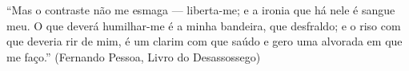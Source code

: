 

\begin{epigrafe}
    \vspace*{\fill}
	{
		\noindent\hspace{.5\textwidth}
		{\begin{minipage}{.5\textwidth}
			\begin{flushright}
				``Mas o contraste não me esmaga — liberta-me; e a ironia que há nele é sangue meu. O que deverá humilhar-me é a
				minha bandeira, que desfraldo; e o riso com que deveria rir
				de mim, é um clarim com que saúdo e gero uma alvorada em
				que me faço.'' (Fernando Pessoa, Livro do Desassossego)
			\end{flushright}
		\end{minipage}}%
		\vspace*{3cm}
	}
\end{epigrafe}
